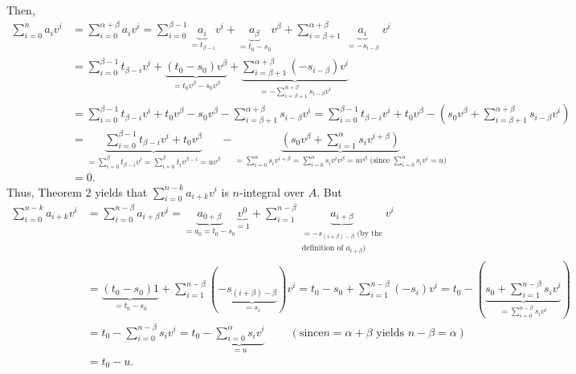 \documentclass[12pt,final,notitlepage,onecolumn]{article}%
\begin{document}
Then,%
\begin{align*}
\sum\limits_{i=0}^{n}a_{i}v^{i}  &  =\sum\limits_{i=0}^{\alpha+\beta}%
a_{i}v^{i}=\sum\limits_{i=0}^{\beta-1}\underbrace{a_{i}}_{=t_{\beta-i}}%
v^{i}+\underbrace{a_{\beta}}_{=t_{0}-s_{0}}v^{\beta}+\sum\limits_{i=\beta
+1}^{\alpha+\beta}\underbrace{a_{i}}_{\substack{=-s_{i-\beta}}}v^{i}\\
&  =\sum\limits_{i=0}^{\beta-1}t_{\beta-i}v^{i}+\underbrace{\left(
t_{0}-s_{0}\right)  v^{\beta}}_{=t_{0}v^{\beta}-s_{0}v^{\beta}}%
+\underbrace{\sum\limits_{i=\beta+1}^{\alpha+\beta}\left(  -s_{i-\beta
}\right)  v^{i}}_{=-\sum\limits_{i=\beta+1}^{\alpha+\beta}s_{i-\beta}v^{i}}\\
&  =\sum\limits_{i=0}^{\beta-1}t_{\beta-i}v^{i}+t_{0}v^{\beta}-s_{0}v^{\beta
}-\sum\limits_{i=\beta+1}^{\alpha+\beta}s_{i-\beta}v^{i}=\sum\limits_{i=0}%
^{\beta-1}t_{\beta-i}v^{i}+t_{0}v^{\beta}-\left(  s_{0}v^{\beta}%
+\sum\limits_{i=\beta+1}^{\alpha+\beta}s_{i-\beta}v^{i}\right) \\
&  =\underbrace{\sum\limits_{i=0}^{\beta-1}t_{\beta-i}v^{i}+t_{0}v^{\beta}%
}_{=\sum\limits_{i=0}^{\beta}t_{\beta-i}v^{i}=\sum\limits_{i=0}^{\beta}%
t_{i}v^{\beta-i}=uv^{\beta}}-\underbrace{\left(  s_{0}v^{\beta}+\sum
\limits_{i=1}^{\alpha}s_{i}v^{i+\beta}\right)  }_{=\sum\limits_{i=0}^{\alpha
}s_{i}v^{i+\beta}=\sum\limits_{i=0}^{\alpha}s_{i}v^{i}v^{\beta}=uv^{\beta
}\text{ (since }\sum\limits_{i=0}^{\alpha}s_{i}v^{i}=u\text{)}}\\
&  =0.
\end{align*}
Thus, Theorem 2 yields that $\sum\limits_{i=0}^{n-k}a_{i+k}v^{i}$ is
$n$-integral over $A$. But%
\begin{align*}
\sum\limits_{i=0}^{n-k}a_{i+k}v^{i}  &  =\sum\limits_{i=0}^{n-\beta}%
a_{i+\beta}v^{i}=\underbrace{a_{0+\beta}}_{=a_{0}=t_{0}-s_{0}}%
\underbrace{v^{0}}_{=1}+\sum\limits_{i=1}^{n-\beta}\underbrace{a_{i+\beta}%
}_{\substack{=-s_{\left(  i+\beta\right)  -\beta}\text{ (by the}%
\\\text{definition of }a_{i+\beta}\text{)}}}v^{i}\\
&  =\underbrace{\left(  t_{0}-s_{0}\right)  1}_{=t_{0}-s_{0}}+\sum
\limits_{i=1}^{n-\beta}\left(  -\underbrace{s_{\left(  i+\beta\right)  -\beta
}}_{=s_{i}}\right)  v^{i}=t_{0}-s_{0}+\sum\limits_{i=1}^{n-\beta}\left(
-s_{i}\right)  v^{i}=t_{0}-\left(  \underbrace{s_{0}+\sum\limits_{i=1}%
^{n-\beta}s_{i}v^{i}}_{=\sum\limits_{i=0}^{n-\beta}s_{i}v^{i}}\right) \\
&  =t_{0}-\sum\limits_{i=0}^{n-\beta}s_{i}v^{i}=t_{0}-\underbrace{\sum
\limits_{i=0}^{\alpha}s_{i}v^{i}}_{=u}\ \ \ \ \ \ \ \ \ \ \left(  \text{since
}n=\alpha+\beta\text{ yields }n-\beta=\alpha\right) \\
&  =t_{0}-u.
\end{align*}
\end{document}
